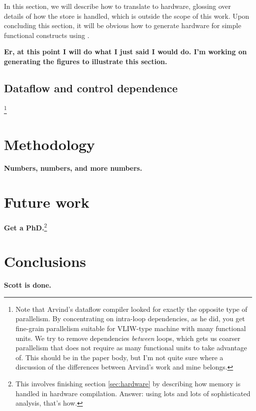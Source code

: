 \documentclass[12pt,titlepage,twoside]{article}
\let\oldsection\section
\renewcommand{\section}{\setcounter{figure}{0}\setcounter{table}{0}\oldsection}
\begin{document}
In this section, we will describe how to translate \ssiplus{} to
hardware, glossing over details of how the store is handled, which is
outside the scope of this work.  Upon concluding this section, it will
be obvious how to generate hardware for simple functional constructs
using \ssiplus.

\textbf{Er, at this point I will do what I just said I would do.  I'm
working on generating the figures to illustrate this section.}%

\subsection{Dataflow and control dependence}
\footnote{Note that Arvind's
dataflow compiler \cite{traub86:ttda} looked for exactly the opposite type of
parallelism.  By concentrating on intra-loop dependencies, as he did, you get
fine-grain parallelism suitable for VLIW-type machine with many
functional units.  We try to remove dependencies \emph{between} loops,
which gets us coarser parallelism that does not require as many
functional units to take advantage of.  This should be in the paper
body, but I'm not quite sure where a discussion of the differences
between Arvind's work and mine belongs.}


\section{Methodology}\label{sec:methodology}
\textbf{Numbers, numbers, and more numbers.}

\section{Future work}
\textbf{Get a PhD.}\footnote{This involves finishing section
\ref{sec:hardware} by describing how memory is handled in hardware
compilation.  Answer: using lots and lots of sophisticated analysis,
that's how.}

\section{Conclusions}
\textbf{Scott is done.}
\end{document}
